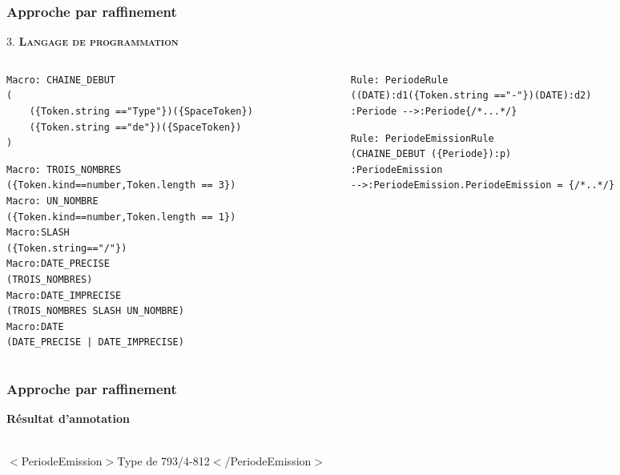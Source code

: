 \documentclass[10pt, compress]{beamer}
\begin{document}
\begin{frame}[fragile,t]
  \frametitle{Approche par raffinement}
\begin{center}
 
\end{center}
3. \textbf{\textsc{\textbf{Langage de programmation}}}\\
\begin{columns}[t]
  \begin{column}{.5\linewidth}
\begin{lstlisting}
Macro: CHAINE_DEBUT
(
    ({Token.string =="Type"})({SpaceToken})
    ({Token.string =="de"})({SpaceToken})
)
\end{lstlisting}
\begin{lstlisting}
Macro: TROIS_NOMBRES
({Token.kind==number,Token.length == 3})
Macro: UN_NOMBRE
({Token.kind==number,Token.length == 1})
Macro:SLASH
({Token.string=="/"})
Macro:DATE_PRECISE
(TROIS_NOMBRES)
Macro:DATE_IMPRECISE
(TROIS_NOMBRES SLASH UN_NOMBRE)
Macro:DATE
(DATE_PRECISE | DATE_IMPRECISE)
\end{lstlisting}
\end{column}


\begin{column}{.5\linewidth}
\begin{lstlisting}
Rule: PeriodeRule
((DATE):d1({Token.string =="-"})(DATE):d2)
:Periode -->:Periode{/*...*/}
\end{lstlisting}
\begin{lstlisting}
Rule: PeriodeEmissionRule
(CHAINE_DEBUT ({Periode}):p)
:PeriodeEmission
-->:PeriodeEmission.PeriodeEmission = {/*..*/}
\end{lstlisting}
\end{column}
\end{columns}
\end{frame}

\begin{frame}[fragile]
  \frametitle{Approche par raffinement}
\textbf{Résultat d'annotation}\\~
\begin{center}
\alert{$<$PeriodeEmission$>$}Type de 793/4-812\alert{$<$/PeriodeEmission$>$}\\~\\
\end{center}
\hfill{}

\end{frame}
\end{document}
